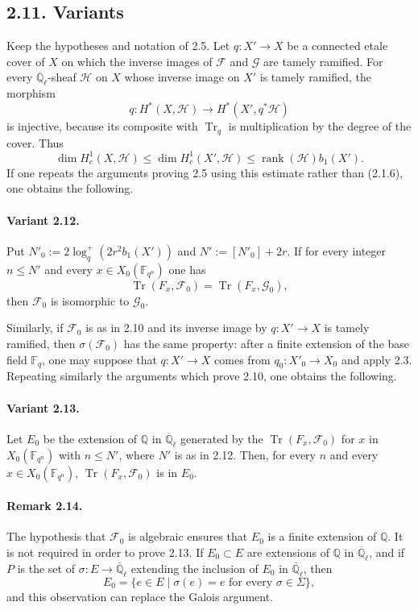 \documentclass[11pt]{article}
\newcommand{\F}{\mathbb{F}}
\newcommand{\Q}{\mathbb{Q}}
\newcommand{\Ql}{\overline{\mathbb Q}_{\ell}}
\newcommand{\Tr}{\operatorname{Tr}}
\newcommand{\rank}{\operatorname{rank}}
\begin{document}
\subsection*{2.11. Variants}
Keep the hypotheses and notation of 2.5.
Let $q:X'\to X$ be a connected etale cover of $X$ on which the inverse images of $\mathcal F$ and $\mathcal G$ are tamely ramified.
For every $\Ql$-sheaf $\mathcal H$ on $X$ whose inverse image on $X'$ is tamely ramified, the morphism
\[
 q:H^*(X,\mathcal H)\to H^*(X',q^*\mathcal H)
\]
is injective, because its composite with $\Tr_q$ is multiplication by the degree of the cover.
Thus
\[
 \dim H^1_c(X,\mathcal H)\le \dim H^1_c(X',\mathcal H)\le \rank(\mathcal H)b_1(X').
\]
If one repeats the arguments proving 2.5 using this estimate rather than (2.1.6), one obtains the following.

\paragraph{Variant 2.12.}
Put $N'_0:=2\log_q^+(2r^2b_1(X'))$ and $N':=[N'_0]+2r$.
If for every integer $n\le N'$ and every $x\in X_0(\F_{q^n})$ one has
\[
 \Tr(F_x,\mathcal F_0)=\Tr(F_x,\mathcal G_0),
\]
then $\mathcal F_0$ is isomorphic to $\mathcal G_0$.

Similarly, if $\mathcal F_0$ is as in 2.10 and its inverse image by $q:X'\to X$ is tamely ramified, then $\sigma(\mathcal F_0)$ has the same property: after a finite extension of the base field $\F_q$, one may suppose that $q:X'\to X$ comes from $q_0:X'_0\to X_0$ and apply 2.3.
Repeating similarly the arguments which prove 2.10, one obtains the following.

\paragraph{Variant 2.13.}
Let $E_0$ be the extension of $\Q$ in $\Ql$ generated by the $\Tr(F_x,\mathcal F_0)$ for $x$ in $X_0(\F_{q^n})$ with $n\le N'$, where $N'$ is as in 2.12.
Then, for every $n$ and every $x\in X_0(\F_{q^n})$, $\Tr(F_x,\mathcal F_0)$ is in $E_0$.

\paragraph{Remark 2.14.}
The hypothesis that $\mathcal F_0$ is algebraic ensures that $E_0$ is a finite extension of $\Q$.
It is not required in order to prove 2.13.
If $E_0\subset E$ are extensions of $\Q$ in $\Ql$, and if $P$ is the set of $\sigma:E\to\Ql$ extending the inclusion of $E_0$ in $\Ql$, then
\[
 E_0=\{e\in E\mid \sigma(e)=e\text{ for every }\sigma\in\Sigma\},
\]
and this observation can replace the Galois argument.
\end{document}
